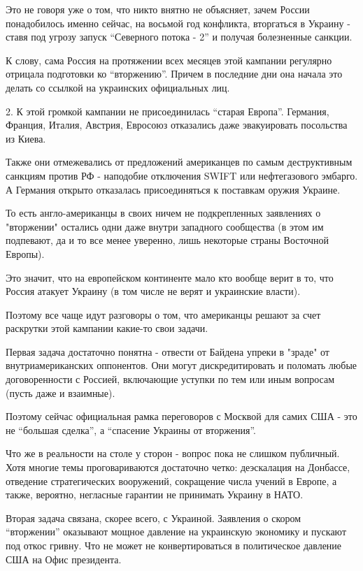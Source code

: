 Это не говоря уже о том, что никто внятно не объясняет, зачем России
понадобилось именно сейчас, на восьмой год конфликта, вторгаться в Украину -
ставя под угрозу запуск \enquote{Северного потока - 2} и получая болезненные санкции. 

К слову, сама Россия на протяжении всех месяцев этой кампании регулярно
отрицала подготовки ко \enquote{вторжению}. Причем в последние дни она начала это
делать со ссылкой на украинских официальных лиц.

2. К этой громкой кампании не присоединилась \enquote{старая Европа}. Германия,
Франция, Италия, Австрия, Евросоюз отказались даже эвакуировать посольства из
Киева.

Также они отмежевались от предложений американцев по самым деструктивным
санкциям против РФ - наподобие отключения SWIFT или нефтегазового эмбарго. А
Германия открыто отказалась присоединяться к поставкам оружия Украине. 

То есть англо-американцы в своих ничем не подкрепленных заявлениях о
"вторжении" остались одни даже внутри западного сообщества (в этом им
подпевают, да и то все менее уверенно, лишь некоторые страны Восточной Европы).

Это значит, что на европейском континенте мало кто вообще верит в то, что
Россия атакует Украину (в том числе не верят и украинские власти).

Поэтому все чаще идут разговоры о том, что американцы решают за счет раскрутки
этой кампании какие-то свои задачи.

Первая задача достаточно понятна - отвести от Байдена упреки в "зраде" от
внутриамериканских оппонентов. Они могут дискредитировать и поломать любые
договоренности с Россией, включающие уступки по тем или иным вопросам (пусть
даже и взаимные).

Поэтому сейчас официальная рамка переговоров с Москвой для самих США - это не
\enquote{большая сделка}, а \enquote{спасение Украины от вторжения}.

Что же в реальности на столе у сторон - вопрос пока не слишком публичный. Хотя
многие темы проговариваются достаточно четко: деэскалация на Донбассе,
отведение стратегических вооружений, сокращение числа учений в Европе, а также,
вероятно, негласные гарантии не принимать Украину в НАТО.

Вторая задача связана, скорее всего, с Украиной. Заявления о скором \enquote{вторжении}
оказывают мощное давление на украинскую экономику и пускают под откос гривну.
Что не может не конвертироваться в политическое давление США на Офис
президента.

